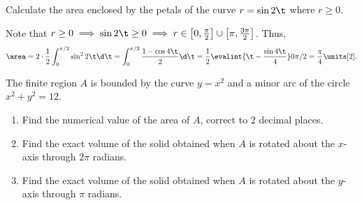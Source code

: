 \begin{problem}
    Calculate the area enclosed by the petals of the curve $r = \sin2\t$ where $r \geq 0$.
\end{problem}
\begin{solution}
    Note that $r \geq 0 \implies \sin2\t \geq 0 \implies r \in \left[0, \frac\pi2\right] \cup \left[\pi, \frac{3\pi}2\right]$. Thus, \[\area = 2 \cdot \frac12 \int_0^{\pi/2} \sin^2 2\t \d \t = \int_0^{\pi/2} \frac{1 - \cos 4\t}{2} \d \t = \frac12 \evalint{\t - \frac{\sin 4\t}{4}}0{\pi/2}= \frac{\pi}4 \units[2].\]
\end{solution}

\begin{problem}
    The finite region $A$ is bounded by the curve $y = x^2$ and a minor arc of the circle $x^2 + y^2 = 12$.

    \begin{enumerate}
        \item Find the numerical value of the area of $A$, correct to 2 decimal places.
        \item Find the exact volume of the solid obtained when $A$ is rotated about the $x$-axis through $2\pi$ radians.
        \item Find the exact volume of the solid obtained when $A$ is rotated about the $y$-axis through $\pi$ radians.
    \end{enumerate}
\end{problem}
